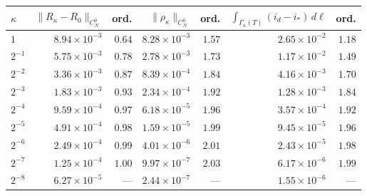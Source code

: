\begin{tabular}{@{}lrrrrrr@{}}
\toprule
$\kappa$ & $\|R_\kappa-R_0\|_{C_N^0}$ & ord. & $\|\rho_\kappa\|_{C_N^0}$ & ord. & $\int_{\Gamma_\kappa(T)}(i_d-i_*)\,d\ell$ & ord.\\
\midrule
$1$ & $8.94\times10^{-3}$ & $0.64$ & $8.28\times10^{-3}$ & $1.57$ & $2.65\times10^{-2}$ & $1.18$\\
$2^{-1}$ & $5.75\times10^{-3}$ & $0.78$ & $2.78\times10^{-3}$ & $1.73$ & $1.17\times10^{-2}$ & $1.49$\\
$2^{-2}$ & $3.36\times10^{-3}$ & $0.87$ & $8.39\times10^{-4}$ & $1.84$ & $4.16\times10^{-3}$ & $1.70$\\
$2^{-3}$ & $1.83\times10^{-3}$ & $0.93$ & $2.34\times10^{-4}$ & $1.92$ & $1.28\times10^{-3}$ & $1.84$\\
$2^{-4}$ & $9.59\times10^{-4}$ & $0.97$ & $6.18\times10^{-5}$ & $1.96$ & $3.57\times10^{-4}$ & $1.92$\\
$2^{-5}$ & $4.91\times10^{-4}$ & $0.98$ & $1.59\times10^{-5}$ & $1.99$ & $9.45\times10^{-5}$ & $1.96$\\
$2^{-6}$ & $2.49\times10^{-4}$ & $0.99$ & $4.01\times10^{-6}$ & $2.01$ & $2.43\times10^{-5}$ & $1.98$\\
$2^{-7}$ & $1.25\times10^{-4}$ & $1.00$ & $9.97\times10^{-7}$ & $2.03$ & $6.17\times10^{-6}$ & $1.99$\\
$2^{-8}$ & $6.27\times10^{-5}$ & --- & $2.44\times10^{-7}$ & --- & $1.55\times10^{-6}$ & ---\\
\bottomrule
\end{tabular}

